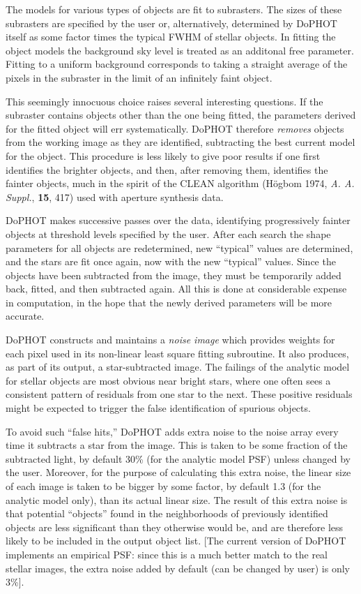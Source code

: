 The models for various types of objects are fit to
subrasters.  The sizes of these subrasters are
specified by the user or, alternatively,
determined by DoPHOT itself as some factor times the typical
FWHM of stellar objects.    In fitting the object
models the background sky level is treated as an additonal
free parameter.  Fitting to a uniform background corresponds
to taking a straight average of the pixels in the subraster
in the limit of an infinitely faint object.

This seemingly innocuous choice raises several interesting
questions.  If the subraster contains objects other than the
one being fitted, the parameters derived for the fitted
object will err systematically.  DoPHOT therefore {\it
removes} objects from the working image as they are
identified, subtracting the best current model for the
object.  This procedure is less likely to give poor results
if one first identifies the brighter objects, and then,
after removing them, identifies the fainter objects, much in
the spirit of the CLEAN algorithm (H\" ogbom 1974, {\it A. A.
Suppl.}, {\bf 15}, 417) used with
aperture synthesis data.

DoPHOT makes successive passes over the data, identifying
progressively fainter objects at threshold levels specified
by the user.  After each search the shape parameters for all
objects are redetermined, new ``typical'' values are
determined, and the stars are fit once again, now with the
new ``typical'' values.  Since the objects have been
subtracted from the image, they must be temporarily added
back, fitted, and then subtracted again.  All this is done
at considerable expense in computation, in the hope that the
newly derived parameters will be more accurate.

DoPHOT constructs and maintains a {\it noise image} which
provides weights for each pixel used in its non-linear least square fitting
subroutine.  It also produces, as part of its output, a
star-subtracted image.  The failings of the analytic model
for stellar objects are most obvious near bright stars,
where one often sees a consistent pattern of residuals from one
star to the next.  These positive residuals might be expected
to trigger the false identification of spurious objects.

To avoid such ``false hits,'' DoPHOT adds extra noise to the
noise array every time it subtracts a star from the image.
This is taken to be some fraction of the subtracted light,
by default 30\% (for the analytic model PSF)
 unless changed by the user.  Moreover, for
the purpose of calculating this extra noise, the linear size
of each image is taken to be bigger by some factor, by
default 1.3 (for the analytic model only), 
than its actual linear size.  The result of
this extra noise is that potential ``objects'' found in the
neighborhoods of previously identified objects are less
significant than they otherwise would be, and are therefore
less likely to be included in the output object list.
[The current version of DoPHOT implements an empirical PSF: since 
this is a much better match to the real stellar images, 
the extra noise added by default (can be changed by user) is only
3\%].

